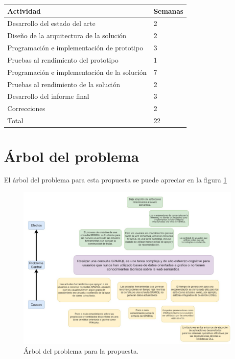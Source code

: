\documentclass[conference,compsoc]{IEEEtran}
\begin{document}
\begin{table}[h]
    \centering
    \begin{tabular}{|l|l|}
        \hline
        Actividad                                    & Semanas \\ \hline
        Desarrollo del estado del arte               & 2       \\ \hline
        Diseño de la arquitectura de la solución     & 2       \\ \hline
        Programación e implementación de prototipo   & 3       \\ \hline
        Pruebas al rendimiento del prototipo         & 1       \\ \hline
        Programación e implementación de la solución & 7       \\ \hline
        Pruebas al rendimiento de la solución        & 2       \\ \hline
        Desarrollo del informe final                 & 3       \\ \hline
        Correcciones                                 & 2       \\ \hline
        Total                                        & 22      \\ \hline
    \end{tabular}
\end{table}





\newpage
\onecolumn
\appendices
{}


\section{Árbol del problema}

El árbol del problema para esta propuesta se puede apreciar en la figura \ref{fig:arbol-prob}

\begin{figure}[htbp]
    \label{fig:arbol-prob}
    \centering
    \includegraphics[width=\textwidth]{arbol}
    \caption{Árbol del problema para la propuesta.}
\end{figure}
\end{document}

